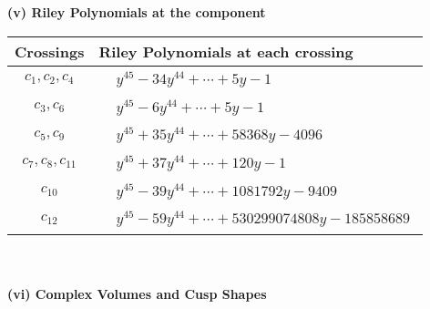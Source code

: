 \documentclass[1p]{elsarticle_modified}
\theoremstyle{definition}
\begin{document}
\newpage\renewcommand{\arraystretch}{1}
\flushleft \textbf{(v) Riley Polynomials at the component}\newline \\
\begin{tabular}{m{50pt}|m{274pt}}
Crossings & \hspace{64pt}Riley Polynomials at each crossing \\
\hline $$\begin{aligned}c_{1},c_{2},c_{4}\end{aligned}$$&$\begin{aligned}
&y^{45}-34 y^{44}+\cdots+5 y-1
\end{aligned}$\\
\hline $$\begin{aligned}c_{3},c_{6}\end{aligned}$$&$\begin{aligned}
&y^{45}-6 y^{44}+\cdots+5 y-1
\end{aligned}$\\
\hline $$\begin{aligned}c_{5},c_{9}\end{aligned}$$&$\begin{aligned}
&y^{45}+35 y^{44}+\cdots+58368 y-4096
\end{aligned}$\\
\hline $$\begin{aligned}c_{7},c_{8},c_{11}\end{aligned}$$&$\begin{aligned}
&y^{45}+37 y^{44}+\cdots+120 y-1
\end{aligned}$\\
\hline $$\begin{aligned}c_{10}\end{aligned}$$&$\begin{aligned}
&y^{45}-39 y^{44}+\cdots+1081792 y-9409
\end{aligned}$\\
\hline $$\begin{aligned}c_{12}\end{aligned}$$&$\begin{aligned}
&y^{45}-59 y^{44}+\cdots+530299074808 y-185858689
\end{aligned}$\\
\hline
\end{tabular}\\~\\
\newpage\flushleft \textbf{(vi) Complex Volumes and Cusp Shapes}
\end{document}

